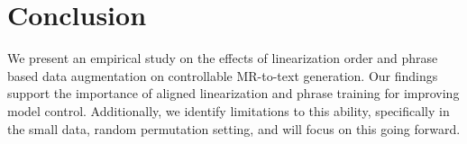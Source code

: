 \section{Conclusion}

We present an empirical study on the effects of linearization order
and phrase based data augmentation on controllable
MR-to-text generation. Our findings support the importance of
aligned linearization and phrase training for improving model control.
Additionally, we identify limitations to this ability, specifically in the small data, random permutation setting, and will focus on this going forward.


